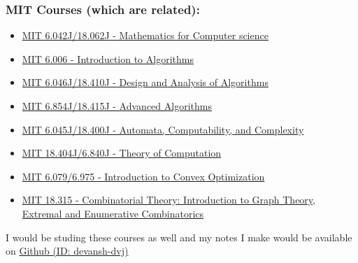 \subsubsection*{MIT Courses (which are related):}
\vspace{-2mm}
\begin{itemize}[itemsep = -1 mm]
  \item \href{https://ocw.mit.edu/courses/electrical-engineering-and-computer-science/6-042j-mathematics-for-computer-science-fall-2010/}{MIT 6.042J/18.062J - Mathematics for Computer science}
  \item \href{https://ocw.mit.edu/courses/electrical-engineering-and-computer-science/6-006-introduction-to-algorithms-fall-2011/}{MIT 6.006 - Introduction to Algorithms}
  \item \href{https://ocw.mit.edu/courses/electrical-engineering-and-computer-science/6-046j-design-and-analysis-of-algorithms-spring-2015/}{MIT 6.046J/18.410J - Design and Analysis of Algorithms}
  \item \href{https://ocw.mit.edu/courses/electrical-engineering-and-computer-science/6-854j-advanced-algorithms-fall-2008/index.htm}{MIT 6.854J/18.415J - Advanced Algorithms}
  \item \href{https://ocw.mit.edu/courses/electrical-engineering-and-computer-science/6-045j-automata-computability-and-complexity-spring-2011/}{MIT 6.045J/18.400J - Automata, Computability, and Complexity}
  \item \href{https://ocw.mit.edu/courses/mathematics/18-404j-theory-of-computation-fall-2006/}{MIT 18.404J/6.840J - Theory of Computation}
  \item \href{https://ocw.mit.edu/courses/electrical-engineering-and-computer-science/6-079-introduction-to-convex-optimization-fall-2009/}{MIT 6.079/6.975 - Introduction to Convex Optimization}
  \item \href{https://ocw.mit.edu/courses/mathematics/18-315-combinatorial-theory-introduction-to-graph-theory-extremal-and-enumerative-combinatorics-spring-2005/}{MIT 18.315 - Combinatorial Theory: Introduction to Graph Theory, Extremal and Enumerative Combinatorics}
\end{itemize}

\noindent
I would be studing these courses as well and my notes I make would be available on \href{https://github.com/devansh-dvj}{Github (ID: devansh-dvj)}
